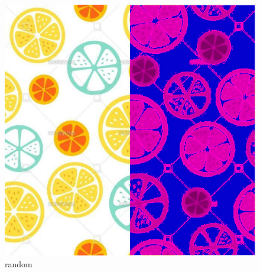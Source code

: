 \documentclass[10pt]{article}
\begin{document}
\begin{figure}[h]
  \centering
  \includegraphics*[scale=0.25]{微信图片_20210503105559.png}
\caption{ random }
\end{figure}
\end{document}
